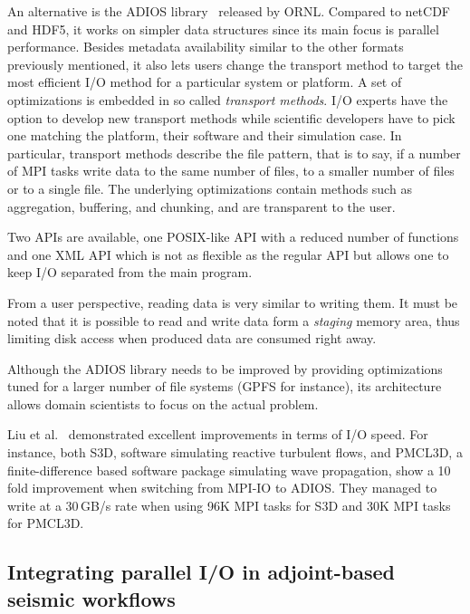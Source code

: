 An alternative is the ADIOS library~\cite{Liu2013}
released by ORNL. Compared to netCDF and HDF5, it works on simpler data
structures since its main focus is parallel performance. Besides metadata
availability similar to the other formats previously mentioned, it also lets
users change the transport method to target the most efficient I/O method for a
particular system or platform. A set of optimizations is embedded in so called
\emph{transport methods}. I/O experts have the option to develop new transport
methods while scientific developers have to pick one matching the platform,
their software and their simulation case. In particular, transport methods
describe the file pattern, that is to say, if a number of MPI tasks write data
to the same number of files, to a smaller number of files or to a single file.
The underlying optimizations contain methods such as aggregation, buffering, and
chunking, and are transparent to the user.

Two APIs are available, one POSIX-like API with a reduced number of functions
and one XML API which is not as flexible as the regular API but allows one to
keep I/O separated from the main program.

From a user perspective, reading data is very similar to writing them. It must
be noted that it is possible to read and write data form a \emph{staging} memory
area, thus limiting disk access when produced data are consumed right away.

Although the ADIOS library needs to be improved by providing optimizations tuned
for a larger number of file systems (GPFS for instance), its architecture allows
domain scientists to focus on the actual problem.

Liu et al.~\cite{Liu2013} demonstrated excellent improvements in terms of I/O
speed. For instance, both S3D, software simulating reactive turbulent flows, and
PMCL3D, a finite-difference based software package simulating wave propagation,
show a 10 fold improvement when switching from MPI-IO to ADIOS. They managed to
write at a 30\,GB/s rate when using 96K MPI tasks for S3D and 30K MPI tasks for
PMCL3D.

\subsection{Integrating parallel I/O in adjoint-based seismic workflows}



